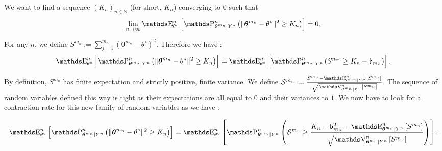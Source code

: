 \begin{pro}\label{pro2.4.1}
We want to find a sequence $\left(K_{n}\right)_{n \in \mathds{N}}$ (for short, $K_{n}$) converging to $0$ such that
\[\lim\limits_{n \rightarrow \infty} \E_{\theta^{\circ}}^{n}\left[\P_{\boldsymbol{\theta}^{m_{n}}\vert Y^{n}}^{n}\left(\Vert \boldsymbol{\theta}^{m_{n}} - \theta^{\circ} \Vert^{2} \geq K_{n}\right)\right] = 0.\]

For any $n$, we define $S^{m_{n}} := \sum_{j=1}^{m_{n}} \left(\boldsymbol{\theta}^{m_{n}} - \theta^{\circ}\right)^{2}$. Therefore we have : 
\[\E_{\theta^{\circ}}^{n}\left[\P_{\boldsymbol{\theta}^{m_{n}}\vert Y^{n}}^{n}\left(\Vert \boldsymbol{\theta}^{m_{n}} - \theta^{\circ} \Vert^{2} \geq K_{n}\right)\right] = \E_{\theta^{\circ}}^{n}\left[\P_{\boldsymbol{\theta}^{m_{n}}\vert Y^{n}}^{n}\left(S^{m_{n}} \geq K_{n} - \mathfrak{b}_{m_{n}}\right)\right].\]

By definition, $S^{m_{n}}$ has finite expectation and strictly positive, finite variance. We define $\mathcal{S}^{m_{n}} := \frac{S^{m_{n}} - \E_{\boldsymbol{\theta}^{m_{n}} \vert Y^{n}}^{n}\left[S^{m_{n}}\right]}{\sqrt{\V_{\boldsymbol{\theta}^{m_{n}}\vert Y^{n}}^{n}[S^{m_{n}}]}}.$ The sequence of random variables defined this way is tight as their expectations are all equal to $0$ and their variances to $1$. We now have to look for a contraction rate for this new family of random variables as we have :

\[\E_{\theta^{\circ}}^{n}\left[\P_{\boldsymbol{\theta}^{m_{n}}\vert Y^{n}}^{n}\left(\Vert \boldsymbol{\theta}^{m_{n}} - \theta^{\circ} \Vert^{2} \geq K_{n}\right)\right] = \E_{\theta^{\circ}}^{n}\left[\P_{\boldsymbol{\theta}^{m_{n}}\vert Y^{n}}^{n}\left(\mathcal{S}^{m_{n}} \geq \frac{K_{n} - \mathfrak{b}_{m_{n}}^{2} - \E_{\boldsymbol{\theta}^{m_{n}} \vert Y^{n}}^{n}\left[S^{m_{n}}\right]}{\sqrt{\V_{\boldsymbol{\theta}^{m_{n}} \vert Y^{n}}^{n}\left[S^{m_{n}}\right]}}\right)\right].\]


\end{pro}
